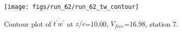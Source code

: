 \begin{figure}[H]
\centering
\texttt{[image: figs/run\_62/run\_62\_tw\_contour]}
\caption{Contour plot of $\overline{t^\prime w^\prime}$ at $z/c$=10.00, $V_{free}$=16.98, station 7.}
\label{fig:run_62_tw_contour}
\end{figure}


